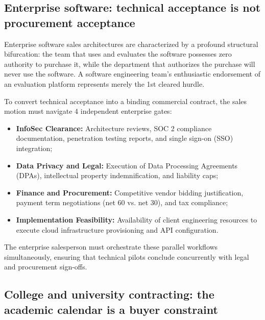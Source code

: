 \subsection{Enterprise software: technical acceptance is not procurement acceptance}

Enterprise software sales architectures are characterized by a profound structural bifurcation: the team that uses and evaluates the software possesses zero authority to purchase it, while the department that authorizes the purchase will never use the software. A software engineering team's enthusiastic endorsement of an evaluation platform represents merely the 1st cleared hurdle.

To convert technical acceptance into a binding commercial contract, the sales motion must navigate 4 independent enterprise gates:
\begin{itemize}
\item \textbf{InfoSec Clearance:} Architecture reviews, SOC 2 compliance documentation, penetration testing reports, and single sign-on (SSO) integration;
\item \textbf{Data Privacy and Legal:} Execution of Data Processing Agreements (DPAs), intellectual property indemnification, and liability caps;
\item \textbf{Finance and Procurement:} Competitive vendor bidding justification, payment term negotiations (net 60 vs. net 30), and tax compliance;
\item \textbf{Implementation Feasibility:} Availability of client engineering resources to execute cloud infrastructure provisioning and API configuration.
\end{itemize}
The enterprise salesperson must orchestrate these parallel workflows simultaneously, ensuring that technical pilots conclude concurrently with legal and procurement sign-offs.

\subsection{College and university contracting: the academic calendar is a buyer constraint}


